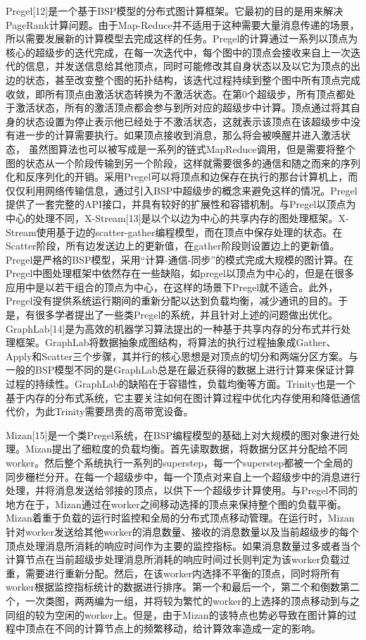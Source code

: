 Pregel[12]是一个基于BSP模型的分布式图计算框架。它最初的目的是用来解决PageRank计算问题。由于Map-Reduce并不适用于这种需要大量消息传递的场景，所以需要发展新的计算模型去完成这样的任务。Pregel的计算通过一系列以顶点为核心的超级步的迭代完成，在每一次迭代中，每个图中的顶点会接收来自上一次迭代的信息，并发送信息给其他顶点，同时可能修改其自身状态以及以它为顶点的出边的状态，甚至改变整个图的拓扑结构，该迭代过程持续到整个图中所有顶点完成收敛，即所有顶点由激活状态转换为不激活状态。在第0个超级步，所有顶点都处于激活状态，所有的激活顶点都会参与到所对应的超级步中计算。顶点通过将其自身的状态设置为停止表示他已经处于不激活状态，这就表示该顶点在该超级步中没有进一步的计算需要执行。如果顶点接收到消息，那么将会被唤醒并进入激活状态，
虽然图算法也可以被写成是一系列的链式MapReduce调用，但是需要将整个图的状态从一个阶段传输到另一个阶段，这样就需要很多的通信和随之而来的序列化和反序列化的开销。采用Pregel可以将顶点和边保存在执行的那台计算机上，而仅仅利用网络传输信息，通过引入BSP中超级步的概念来避免这样的情况。Pregel提供了一套完整的API接口，并具有较好的扩展性和容错机制。与Pregel以顶点为中心的处理不同，X-Stream[13]是以个以边为中心的共享内存的图处理框架。X-Stream使用基于边的scatter-gather编程模型，而在顶点中保存处理的状态。在Scatter阶段，所有边发送边上的更新值，在gather阶段则设置边上的更新值。
Pregel是严格的BSP模型，采用“计算-通信-同步”的模式完成大规模的图计算。在Pregel中图处理框架中依然存在一些缺陷，如pregel以顶点为中心的，但是在很多应用中是以若干组合的顶点为中心，在这样的场景下Pregel就不适合。此外，Pregel没有提供系统运行期间的重新分配以达到负载均衡，减少通讯的目的。于是，有很多学者提出了一些类Pregel的系统，并且针对上述的问题做出优化。
GraphLab[14]是为高效的机器学习算法提出的一种基于共享内存的分布式并行处理框架。GraphLab将数据抽象成图结构，将算法的执行过程抽象成Gather、Apply和Scatter三个步骤，其并行的核心思想是对顶点的切分和两端分区方案。与一般的BSP模型不同的是GraphLab总是在最近获得的数据上进行计算来保证计算过程的持续性。GraphLab的缺陷在于容错性，负载均衡等方面。Trinity也是一个基于内存的分布式系统，它主要关注如何在图计算过程中优化内存使用和降低通信代价，为此Trinity需要昂贵的高带宽设备。

Mizan[15]是一个类Pregel系统，在BSP编程模型的基础上对大规模的图对象进行处理。Mizan提出了细粒度的负载均衡。首先读取数据，将数据分区并分配给不同worker。然后整个系统执行一系列的superstep，每一个superstep都被一个全局的同步栅栏分开。在每一个超级步中，每一个顶点对来自上一个超级步中的消息进行处理，并将消息发送给邻接的顶点，以供下一个超级步计算使用。与Pregel不同的地方在于，Mizan通过在worker之间移动选择的顶点来保持整个图的负载平衡。Mizan着重于负载的运行时监控和全局的分布式顶点移动管理。在运行时，Mizan针对worker发送给其他worker的消息数量、接收的消息数量以及当前超级步的每个顶点处理消息所消耗的响应时间作为主要的监控指标。如果消息数量过多或者当个计算节点在当前超级步处理消息所消耗的响应时间过长则判定为该worker负载过重，需要进行重新分配。然后，在该worker内选择不平衡的顶点，同时将所有worker根据监控指标统计的数据进行排序。第一个和最后一个，第二个和倒数第二个，一次类图，两两编为一组，并将较为繁忙的worker的上选择的顶点移动到与之同组的较为空闲的worker上。但是，由于Mizan的该特点也势必导致在图计算的过程中顶点在不同的计算节点上的频繁移动，给计算效率造成一定的影响。

